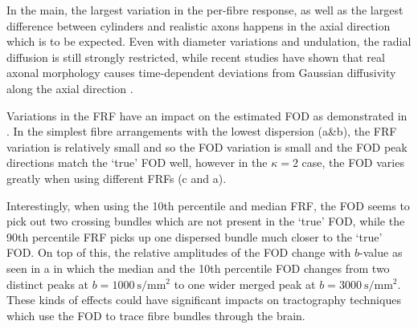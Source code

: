In the main, the largest variation in the per-fibre response, as well as the largest difference between cylinders and realistic axons happens in the axial direction which is to be expected. Even with diameter variations and undulation, the radial diffusion is still strongly restricted, while recent studies have shown that real axonal morphology causes time-dependent deviations from Gaussian diffusivity along the axial direction \cite{Lee2019a}.

Variations in the \ac{FRF} have an impact on the estimated \ac{FOD} as demonstrated in . In the simplest fibre arrangements with the lowest dispersion (a\&b), the \ac{FRF} variation is relatively small and so the \ac{FOD} variation is small and the \ac{FOD} peak directions match the `true' \ac{FOD} well, however in the $\kappa=2$ case, the \ac{FOD} varies greatly when using different \ac{FRF}s (c and a).

Interestingly, when using the 10th percentile and median \ac{FRF}, the \ac{FOD} seems to pick out two crossing bundles which are not present in the `true' \ac{FOD}, while the 90th percentile \ac{FRF} picks up one dispersed bundle much closer to the `true' \ac{FOD}. On top of this, the relative amplitudes of the \ac{FOD} change with $b$-value as seen in a in which the median and the 10th percentile \ac{FOD} changes from two distinct peaks at $b=\SI{1000}{\second\per\milli\metre\squared}$ to one wider merged peak at $b=\SI{3000}{\second\per\milli\metre\squared}$.
These kinds of effects could have significant impacts on tractography techniques which use the \ac{FOD} to trace fibre bundles through the brain.

